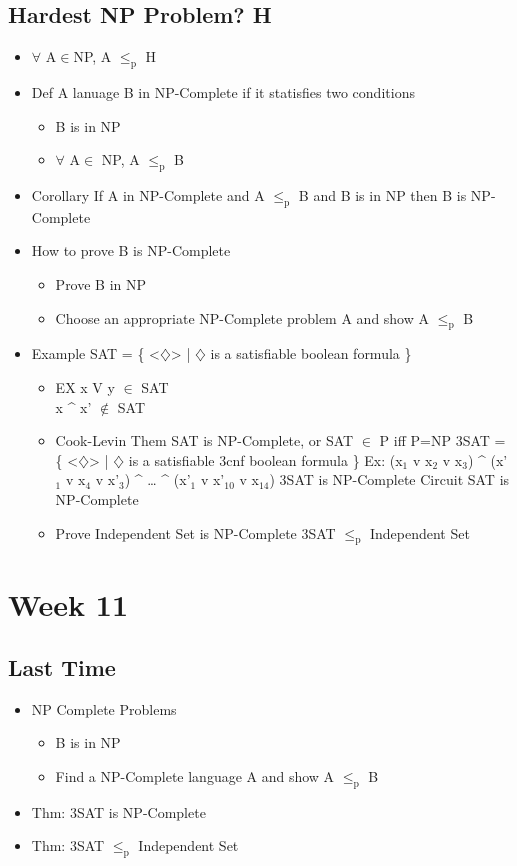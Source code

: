 \documentclass[11pt]{article}
\begin{document}
\subsection{Hardest NP Problem? H}
\label{sec:org8c02576}
\begin{itemize}
\item \(\forall\) A\(\in\)NP, A \(\le_{\text{p}}\) H
\item Def
A lanuage B in NP-Complete if it statisfies two conditions
\begin{itemize}
\item B is in NP
\item \(\forall\) A\(\in\) NP, A \(\le_{\text{p}}\) B
\end{itemize}
\item Corollary
If A in NP-Complete and A \(\le_{\text{p}}\) B and B is in NP then B is NP-Complete
\item How to prove B is NP-Complete
\begin{itemize}
\item Prove B in NP
\item Choose an appropriate NP-Complete problem A and show A \(\le_{\text{p}}\) B
\end{itemize}
\item Example
SAT = \{ <\(\diamondsuit\)> | \(\diamondsuit\) is a satisfiable boolean formula \}
\begin{itemize}
\item EX
x V y \(\in\) SAT\\
x \^{} x' \(\notin\) SAT\\
\item Cook-Levin Them
SAT is NP-Complete, or SAT \(\in\) P iff P=NP
3SAT = \{ <\(\diamondsuit\)> | \(\diamondsuit\) is a satisfiable 3cnf boolean formula \}
Ex: (x\(_{\text{1}}\) v x\(_{\text{2}}\) v x\(_{\text{3}}\)) \^{} (x'\(_{\text{1}}\) v x\(_{\text{4}}\) v x'\(_{\text{3}}\)) \^{} \ldots{} \^{} (x'\(_{\text{1}}\) v x'\(_{\text{10}}\) v x\(_{\text{14}}\))
3SAT is NP-Complete
Circuit SAT is NP-Complete
\item Prove Independent Set is NP-Complete
3SAT \(\le_{\text{p}}\) Independent Set
\end{itemize}
\end{itemize}
\section{Week 11}
\label{sec:org8f285a3}
\subsection{Last Time}
\label{sec:org2913b82}
\begin{itemize}
\item NP Complete Problems
\begin{itemize}
\item B is in NP
\item Find a NP-Complete language A and show A \(\le_{\text{p}}\) B
\end{itemize}
\item Thm: 3SAT is NP-Complete
\item Thm: 3SAT \(\le_{\text{p}}\) Independent Set
\end{itemize}
\end{document}
